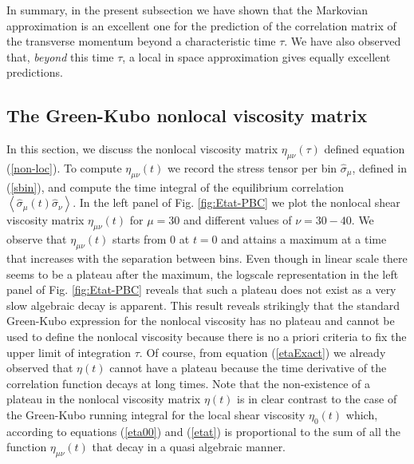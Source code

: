 \documentclass[b5paper,openright,10pt]{book}
\newcommand{\llangle}{\left\langle}
\newcommand{\rrangle}{\right\rangle}
\begin{document}
In summary, in the present subsection we have shown that the Markovian
approximation  is  an   excellent  one  for  the   prediction  of  the
correlation matrix of the  transverse momentum beyond a characteristic
time $\tau$.   We have also  observed that, \textit{beyond}  this time
$\tau$,  a  local  in  space  approximation  gives  equally  excellent
predictions.

\subsection{The Green-Kubo nonlocal viscosity matrix}
In   this  section,   we  discuss   the  nonlocal   viscosity  matrix
$\eta_{\mu\nu}(\tau)$  defined   equation   (\ref{non-loc}).    To  compute
$\eta_{\mu\nu}(t)$   we    record   the   stress   tensor    per   bin
$\hat{\sigma}_\mu$,  defined in  (\ref{sbin}),  and  compute the  time
integral     of     the      equilibrium     correlation     $\llangle
\hat{\sigma}_{\mu}(t)\hat{\sigma}_\nu\rrangle$.         In the left panel of Fig.
\ref{fig:Etat-PBC}  we  plot  the nonlocal  shear  viscosity
matrix  $\eta_{\mu\nu}(t)$  for  $\mu=30$   and  different  values  of
$\nu=30-40$.   We observe  that  $\eta_{\mu\nu}(t)$ starts  from 0  at
$t=0$  and  attains a  maximum  at  a  time  that increases  with  the
separation between bins. Even though in linear scale there seems to be
a plateau after the maximum, the logscale representation in the left
panel of Fig.  \ref{fig:Etat-PBC} reveals that such a plateau
does  not exist  as a  very slow  algebraic decay  is apparent.   This
result reveals strikingly that  the standard Green-Kubo expression for
the nonlocal  viscosity has no plateau  and cannot be used  to define
the nonlocal viscosity  because there is no a priori  criteria to fix
the  upper  limit   of  integration  $\tau$.   Of   course,  from  equation
(\ref{etaExact})  we already  observed  that $\eta(t)$  cannot have  a
plateau because the time derivative of the correlation function decays
at  long times.   Note  that the  non-existence of  a  plateau in  the
nonlocal viscosity matrix $\eta(t)$ is  in clear contrast to the case
of  the Green-Kubo  running  integral for  the  local shear  viscosity
$\eta_0(t)$ which,  according to equations  (\ref{eta00})  and (\ref{etat})
is proportional to the sum of all the function $\eta_{\mu\nu}(t)$ that
decay  in a  quasi  algebraic  manner. 
\end{document}
